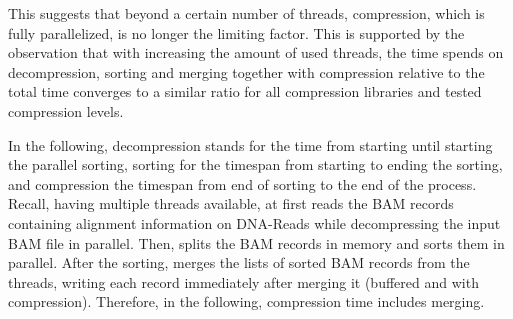 This suggests that beyond a certain number of threads, compression, which is fully parallelized, is no longer the limiting factor. This is supported by the observation that with increasing the amount of used threads, the time \sort spends on decompression, sorting and merging together with compression  relative to the total time converges to a similar ratio for all compression libraries and tested compression levels. 

In the following, decompression stands for the time from starting \sort until starting the parallel sorting, sorting for the timespan from starting to ending the sorting, and compression the timespan from end of sorting to the end of the \sort process. Recall, having multiple threads available, \sort at first reads the BAM records containing alignment information on DNA-Reads while decompressing the input BAM file in parallel. Then, \sort splits the BAM records in memory and sorts them in parallel. After the sorting, \sort merges the lists of sorted BAM records from the threads, writing each record immediately after merging it (buffered and with compression). Therefore, in the following, compression time includes merging.

